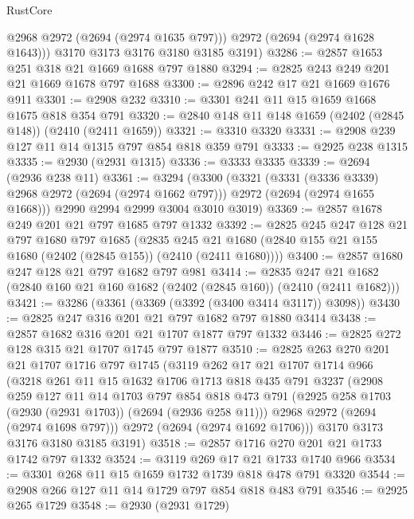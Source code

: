 \begin{lexlean}{RustCore}
\begin{coremodule}
          @2968
          @2972
          (@2694 (@2974 @1635 @797)))
        @2972
        (@2694 (@2974 @1628 @1643)))
      @3170
      @3173
      @3176
      @3180
      @3185
      @3191)
@3286 := @2857 @1653 @251 @318 @21 @1669 @1688 @797 @1880
@3294 := @2825 @243 @249 @201 @21 @1669 @1678 @797 @1688
@3300 := @2896 @242 @17 @21 @1669 @1676 @911
@3301 := @2908 @232
@3310 := @3301 @241 @11 @15 @1659 @1668 @1675 @818 @354 @791
@3320 := @2840 @148 @11 @148 @1659 (@2402 (@2845 @148)) (@2410 (@2411 @1659))
@3321 := @3310 @3320
@3331 := @2908 @239 @127 @11 @14 @1315 @797 @854 @818 @359 @791
@3333 := @2925 @238 @1315
@3335 := @2930 (@2931 @1315)
@3336 := @3333 @3335
@3339 := @2694 (@2936 @238 @11)
@3361 := @3294
    (@3300
      (@3321
        (@3331 (@3336 @3339) @2968 @2972 (@2694 (@2974 @1662 @797)))
        @2972
        (@2694 (@2974 @1655 @1668)))
      @2990
      @2994
      @2999
      @3004
      @3010
      @3019)
@3369 := @2857 @1678 @249 @201 @21 @797 @1685 @797 @1332
@3392 := @2825
    @245
    @247
    @128
    @21
    @797
    @1680
    @797
    @1685
    (@2835 @245 @21 @1680 (@2840 @155 @21 @155 @1680 (@2402 (@2845 @155)) (@2410 (@2411 @1680))))
@3400 := @2857 @1680 @247 @128 @21 @797 @1682 @797 @981
@3414 := @2835 @247 @21 @1682 (@2840 @160 @21 @160 @1682 (@2402 (@2845 @160)) (@2410 (@2411 @1682)))
@3421 := @3286 (@3361 (@3369 (@3392 (@3400 @3414 @3117)) @3098))
@3430 := @2825 @247 @316 @201 @21 @797 @1682 @797 @1880 @3414
@3438 := @2857 @1682 @316 @201 @21 @1707 @1877 @797 @1332
@3446 := @2825 @272 @128 @315 @21 @1707 @1745 @797 @1877
@3510 := @2825
    @263
    @270
    @201
    @21
    @1707
    @1716
    @797
    @1745
    (@3119
      @262
      @17
      @21
      @1707
      @1714
      @966
      (@3218
        @261
        @11
        @15
        @1632
        @1706
        @1713
        @818
        @435
        @791
        @3237
        (@2908
          @259
          @127
          @11
          @14
          @1703
          @797
          @854
          @818
          @473
          @791
          (@2925 @258 @1703 (@2930 (@2931 @1703)) (@2694 (@2936 @258 @11)))
          @2968
          @2972
          (@2694 (@2974 @1698 @797)))
        @2972
        (@2694 (@2974 @1692 @1706)))
      @3170
      @3173
      @3176
      @3180
      @3185
      @3191)
@3518 := @2857 @1716 @270 @201 @21 @1733 @1742 @797 @1332
@3524 := @3119 @269 @17 @21 @1733 @1740 @966
@3534 := @3301 @268 @11 @15 @1659 @1732 @1739 @818 @478 @791 @3320
@3544 := @2908 @266 @127 @11 @14 @1729 @797 @854 @818 @483 @791
@3546 := @2925 @265 @1729
@3548 := @2930 (@2931 @1729)

\end{coremodule}
\end{lexlean}
